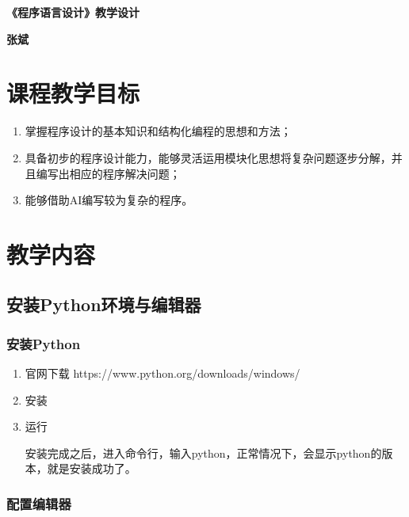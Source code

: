 \documentclass[10pt]{elegantnote}
\begin{document}
\begin{sloppypar} %


\begin{center}
    \bfseries \Large \textcolor{ecolor} {《程序语言设计》教学设计}

    \bfseries \Large \textcolor{ecolor} {张斌}
\end{center}

\tableofcontents

\newpage

\section{课程教学目标}
    \begin{enumerate}
        \item 掌握程序设计的基本知识和结构化编程的思想和方法；        
        \item 具备初步的程序设计能力，能够灵活运用模块化思想将复杂问题逐步分解，并且编写出相应的程序解决问题；
        \item 能够借助AI编写较为复杂的程序。
\end{enumerate}

\section{教学内容}

\subsection{安装Python环境与编辑器}

\subsubsection{安装Python}

    \begin{enumerate}
      \item 官网下载 https://www.python.org/downloads/windows/
      \item 安装
      \item 运行
      
      安装完成之后，进入命令行，输入python，正常情况下，会显示python的版本，就是安装成功了。
    \end{enumerate}

\subsubsection{配置编辑器}


\end{sloppypar}
\end{document}
